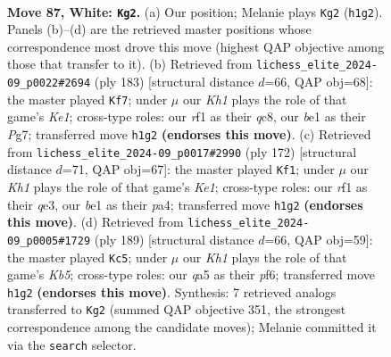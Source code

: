 \documentclass[11pt]{article}
\begin{document}
\clearpage

\begin{figure}[p]\centering
\begin{subfigure}{0.46\textwidth}\centering
\resizebox{\linewidth}{!}{%
\newchessgame
\chessboard[
  setfen={4k3/p5Q1/7r/q6P/3P4/4P3/7N/4br1K w - - 1 87},
  showmover=false,
  pgfstyle=straightmove, color=movearrow, markmove={h1-g2}
]}
\caption{}
\end{subfigure}\hfill
\begin{subfigure}{0.46\textwidth}\centering
\resizebox{\linewidth}{!}{%
\newchessgame
\chessboard[
  setfen={2Q1k3/6p1/4p3/3bP1p1/3R2P1/8/5q2/2K5 b - - 23 92},
  showmover=false,
  pgfstyle=straightmove, color=movearrow, markmove={e8-f7}
]}
\caption{}
\end{subfigure}
\\[4pt]
\begin{subfigure}{0.46\textwidth}\centering
\resizebox{\linewidth}{!}{%
\newchessgame
\chessboard[
  setfen={8/6Q1/1Pp1k2p/8/p6P/4q1P1/8/4K3 w - - 11 87},
  showmover=false,
  pgfstyle=straightmove, color=movearrow, markmove={e1-f1}
]}
\caption{}
\end{subfigure}\hfill
\begin{subfigure}{0.46\textwidth}\centering
\resizebox{\linewidth}{!}{%
\newchessgame
\chessboard[
  setfen={8/5p2/5P2/4q3/1kp2R2/1R6/2K5/8 b - - 39 95},
  showmover=false,
  pgfstyle=straightmove, color=movearrow, markmove={b4-c5}
]}
\caption{}
\end{subfigure}
\caption{\textbf{Move 87, White: \texttt{Kg2}.} (a) Our position; Melanie plays \texttt{Kg2} (\texttt{h1g2}). Panels (b)--(d) are the retrieved master positions whose correspondence most drove this move (highest QAP objective among those that transfer to it). (b) Retrieved from \texttt{lichess\_elite\_2024-09\_p0022\#2694} (ply 183) [structural distance $d$=66, QAP obj=68]: the master played \texttt{Kf7}; under $\mu$ our \emph{Kh1} plays the role of that game's \emph{Ke1}; cross-type roles: our \emph{r}f1 as their \emph{q}c8, our \emph{b}e1 as their \emph{P}g7; transferred move \texttt{h1g2} \textbf{(endorses this move)}. (c) Retrieved from \texttt{lichess\_elite\_2024-09\_p0017\#2990} (ply 172) [structural distance $d$=71, QAP obj=67]: the master played \texttt{Kf1}; under $\mu$ our \emph{Kh1} plays the role of that game's \emph{Ke1}; cross-type roles: our \emph{r}f1 as their \emph{q}e3, our \emph{b}e1 as their \emph{p}a4; transferred move \texttt{h1g2} \textbf{(endorses this move)}. (d) Retrieved from \texttt{lichess\_elite\_2024-09\_p0005\#1729} (ply 189) [structural distance $d$=66, QAP obj=59]: the master played \texttt{Kc5}; under $\mu$ our \emph{Kh1} plays the role of that game's \emph{Kb5}; cross-type roles: our \emph{q}a5 as their \emph{p}f6; transferred move \texttt{h1g2} \textbf{(endorses this move)}. Synthesis: 7 retrieved analogs transferred to \texttt{Kg2} (summed QAP objective 351, the strongest correspondence among the candidate moves); Melanie committed it via the \texttt{search} selector.}
\label{fig:thought-m172}
\end{figure}
\end{document}
